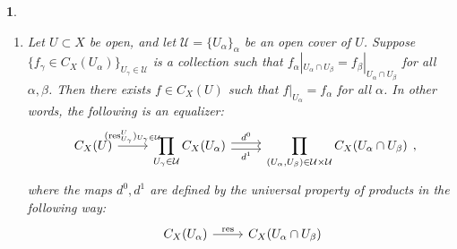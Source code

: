 \documentclass[12pt]{article}
\newtheorem{para}[theorem]{}
\begin{document}
\begin{para}
\begin{enumerate}[label=S\arabic*.,ref=S\arabic*]
		\item\label{sheaf_patching} Let $U\subset X$ be open, and let $\mathcal{U}=\{U_\alpha\}_\alpha$ be an open cover of $U$. Suppose $\{f_\gamma\in C_X(U_\alpha)\}_{U_\gamma\in \mathcal{U}}$ is a collection such that $f_\alpha|_{U_\alpha\cap U_\beta}=f_\beta|_{U_\alpha\cap U_\beta}$ for all $\alpha,\beta$. Then there exists $f\in C_X(U)$ such that $f|_{U_\alpha}=f_\alpha$ for all $\alpha$. In other words, the following is an equalizer:
			\begin{equation*}
\begin{tikzcd}
	C_X(U) \arrow[r, "(\text{res}^U_{U_\gamma})_{U_\gamma\in\mathcal{U}}"] &  {\displaystyle \prod_{U_\gamma\in\mathcal{U}} C_X(U_\alpha)} \arrow[r, "d^0", shift left] \arrow[r, "d^1"', shift right] & {\displaystyle \prod_{(U_\alpha,U_\beta)\in\mathcal{U}\times\mathcal{U}} C_X(U_\alpha\cap U_\beta)}
\end{tikzcd},
			\end{equation*}
			where the maps $d^0, d^1$ are defined by the universal property of products in the following way:
			\begin{equation*}
\begin{tikzcd}
C_X(U_\alpha) \arrow[r, "\text{res}"]                                                                                                                                                                          & C_X(U_\alpha\cap U_\beta)                                                                                                                                                    \\

\end{tikzcd}
\end{equation*}
\end{enumerate}
\end{para}
\end{document}
